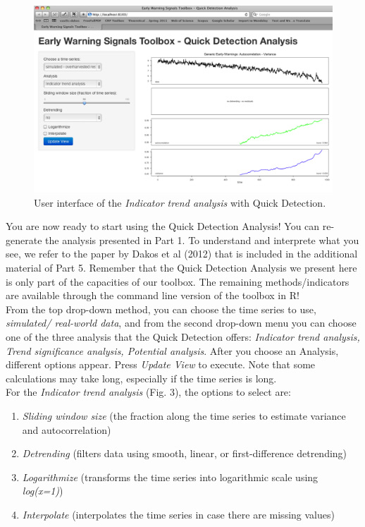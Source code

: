 \documentclass[12pt,a4paper,final]{article}
\begin{document}
\begin{doublespacing}
\begin{figure}[ht]
\begin{center}
\includegraphics[scale=0.4]{demo_start.png}
\caption{User interface of the \textit{Indicator trend analysis} with Quick Detection.}
\end{center}
\end{figure}

You are now ready to start using the Quick Detection Analysis! You can re-generate the analysis presented in Part 1. To understand and interprete what you see, we refer to the paper by Dakos et al (2012) that is included in the additional material of Part 5. Remember that the Quick Detection Analysis we present here is only part of the capacities of our toolbox. The remaining methods/indicators are available through the command line version of the toolbox in R!\\

From the top drop-down method, you can choose the time series to use, \textit{simulated/ real-world data}, and from the second drop-down menu you can choose one of the three analysis that the Quick Detection offers: \textit{Indicator trend analysis, Trend significance analysis, Potential analysis}. After you choose an Analysis, different options appear. Press \textit{Update View} to execute. Note that some calculations may take long, especially if the time series is long.
\\

For the \textit{Indicator trend analysis} (Fig. 3), the options to select are:
\begin{enumerate}
\item \textit{Sliding window size} (the fraction along the time series to estimate variance and autocorrelation)
\item  \textit{Detrending} (filters data using smooth, linear, or first-difference detrending)
\item \textit{Logarithmize} (transforms the time series into logarithmic scale using \textit{log(x=1)})
\item \textit{Interpolate} (interpolates the time series in case there are missing values)
\end{enumerate}


\end{doublespacing}
\end{document}

